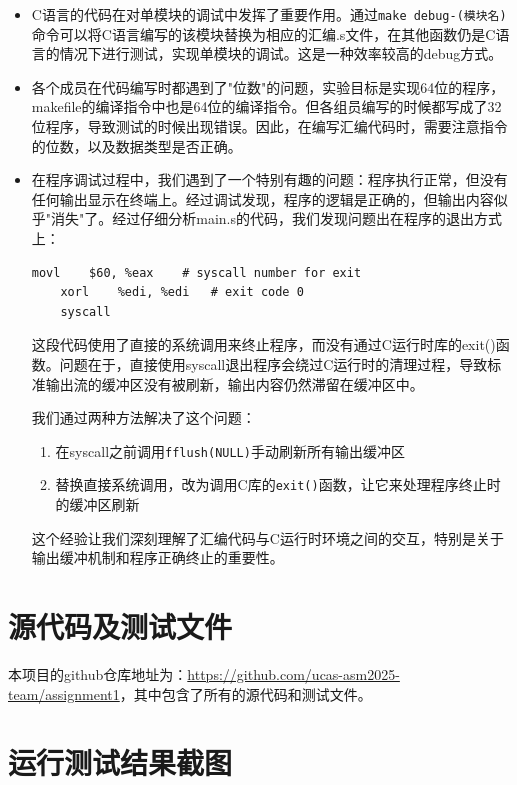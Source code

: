 \documentclass[10pt,a4paper]{article}
\begin{document}
\begin{itemize}
    \item C语言的代码在对单模块的调试中发挥了重要作用。通过\verb|make debug-(模块名)|命令可以将C语言编写的该模块替换为相应的汇编.s文件，在其他函数仍是C语言的情况下进行测试，实现单模块的调试。这是一种效率较高的debug方式。
    
    \item 各个成员在代码编写时都遇到了"位数"的问题，实验目标是实现64位的程序，makefile的编译指令中也是64位的编译指令。但各组员编写的时候都写成了32位程序，导致测试的时候出现错误。因此，在编写汇编代码时，需要注意指令的位数，以及数据类型是否正确。
    
    \item 在程序调试过程中，我们遇到了一个特别有趣的问题：程序执行正常，但没有任何输出显示在终端上。经过调试发现，程序的逻辑是正确的，但输出内容似乎"消失"了。经过仔细分析main.s的代码，我们发现问题出在程序的退出方式上：

    \begin{lstlisting}[language={[x86masm]Assembler}]
    movl    $60, %eax    # syscall number for exit
    xorl    %edi, %edi   # exit code 0
    syscall
    \end{lstlisting}

    这段代码使用了直接的系统调用来终止程序，而没有通过C运行时库的exit()函数。问题在于，直接使用syscall退出程序会绕过C运行时的清理过程，导致标准输出流的缓冲区没有被刷新，输出内容仍然滞留在缓冲区中。

    我们通过两种方法解决了这个问题：
    \begin{enumerate}
        \item 在syscall之前调用\verb|fflush(NULL)|手动刷新所有输出缓冲区
        \item 替换直接系统调用，改为调用C库的\verb|exit()|函数，让它来处理程序终止时的缓冲区刷新
    \end{enumerate}

    这个经验让我们深刻理解了汇编代码与C运行时环境之间的交互，特别是关于输出缓冲机制和程序正确终止的重要性。
\end{itemize}

\section{源代码及测试文件}

本项目的github仓库地址为：\url{https://github.com/ucas-asm2025-team/assignment1}，其中包含了所有的源代码和测试文件。

\section{运行测试结果截图}
\end{document}
